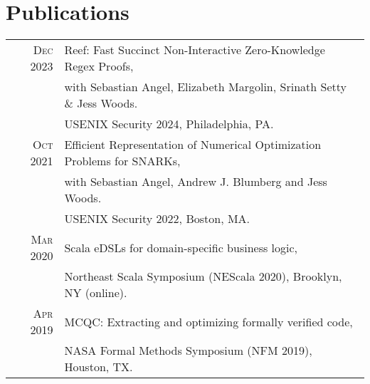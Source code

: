 \documentclass[lettersize,11pt]{article}
\begin{document}
\section{Publications}
\begin{tabular}{rl}
    \textsc{Dec} 2023 & Reef: Fast Succinct Non-Interactive Zero-Knowledge Regex Proofs, \\
                      & with Sebastian Angel, Elizabeth Margolin, Srinath Setty \& Jess Woods. \\
                      & USENIX Security 2024, Philadelphia, PA.  \\[0.5em]
    \textsc{Oct} 2021 & Efficient Representation of Numerical Optimization Problems for SNARKs, \\
                      & with Sebastian Angel, Andrew J. Blumberg and Jess Woods. \\
                      & USENIX Security 2022, Boston, MA.  \\[0.5em]
    \textsc{Mar} 2020 & Scala eDSLs for domain-specific business logic, \\
                      & Northeast Scala Symposium (NEScala 2020), Brooklyn, NY (online). \\[0.5em]
    \textsc{Apr} 2019 & MCQC: Extracting and optimizing formally verified code, \\
                      & NASA Formal Methods Symposium (NFM 2019), Houston, TX. \\
\end{tabular}
\end{document}
